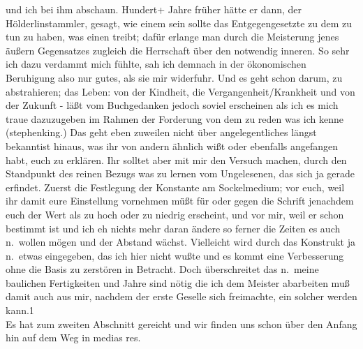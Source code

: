 \documentclass[
]{article}
\begin{document}
und ich bei ihm abschaun. Hundert+ Jahre früher hätte er dann, der
Hölderlinstammler, gesagt, wie einem sein sollte das Entgegengesetzte zu
dem zu tun zu haben, was einen treibt; dafür erlange man durch die
Meisterung jenes äußern Gegensatzes zugleich die Herrschaft über den
notwendig inneren. So sehr ich dazu verdammt mich fühlte, sah ich
demnach in der ökonomischen Beruhigung also nur gutes, als sie mir
widerfuhr. Und es geht schon darum, zu abstrahieren; das Leben: von der
Kindheit, die Vergangenheit/Krankheit und von der Zukunft - läßt vom
Buchgedanken jedoch soviel erscheinen als ich es mich traue dazuzugeben
im Rahmen der Forderung von dem zu reden was ich kenne (stephenking.)
Das geht eben zuweilen nicht über angelegentliches längst bekanntist
hinaus, was ihr von andern ähnlich wißt oder ebenfalls angefangen habt,
euch zu erklären. Ihr solltet aber mit mir den Versuch machen, durch den
Standpunkt des reinen Bezugs was zu lernen vom Ungelesenen, das sich ja
gerade erfindet. Zuerst die Festlegung der Konstante am Sockelmedium;
vor euch, weil ihr damit eure Einstellung vornehmen müßt für oder gegen
die Schrift jenachdem euch der Wert als zu hoch oder zu niedrig
erscheint, und vor mir, weil er schon bestimmt ist und ich eh nichts
mehr daran ändere so ferner die Zeiten es auch n.~wollen mögen und der
Abstand wächst. Vielleicht wird durch das Konstrukt ja n.~etwas
eingegeben, das ich hier nicht wußte und es kommt eine Verbesserung ohne
die Basis zu zerstören in Betracht. Doch überschreitet das n.~meine
baulichen Fertigkeiten und Jahre sind nötig die ich dem Meister
abarbeiten muß damit auch aus mir, nachdem der erste Geselle sich
freimachte, ein solcher werden kann.1\\
Es hat zum zweiten Abschnitt gereicht und wir finden uns schon über den
Anfang hin auf dem Weg in medias res.
\end{document}
